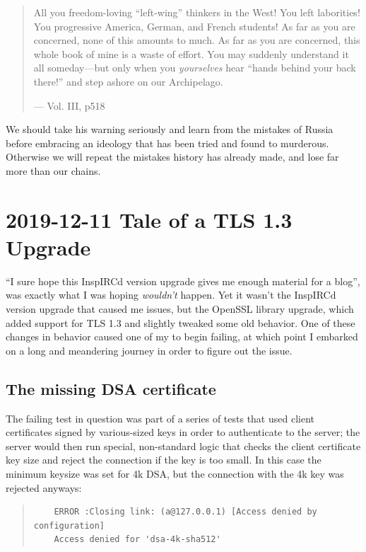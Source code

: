 \documentclass{article}
\begin{document}
\begin{quote}
All you freedom-loving ``left-wing'' thinkers in the West!  You left laborities!  You progressive America, German, and French students!  As far as you are concerned, none of this amounts to much.  As far as you are concerned, this whole book of mine is a waste of effort.  You may suddenly understand it all someday---but only when you \emph{yourselves} hear ``hands behind your back there!'' and step ashore on our Archipelago.

--- Vol. III, p518
\end{quote}

We should take his warning seriously and learn from the mistakes of Russia before embracing an ideology that has been tried and found to murderous.  Otherwise we will repeat the mistakes history has already made, and lose far more than our chains.


\section{2019-12-11 Tale of a TLS 1.3 Upgrade}
``I sure hope this InspIRCd version upgrade gives me enough material for a blog'', was exactly what I was hoping \emph{wouldn't} happen.  Yet it wasn't the InspIRCd version upgrade that caused me issues, but the OpenSSL library upgrade, which added support for TLS 1.3 and slightly tweaked some old behavior.  One of these changes in behavior caused one of my  to begin failing, at which point I embarked on a long and meandering journey in order to figure out the issue.

\subsection{The missing DSA certificate}

The failing test in question was part of a series of tests that used client certificates signed by various-sized  keys in order to authenticate to the server; the server would then run special, non-standard logic that checks the client certificate key size and reject the connection if the key is too small.  In this case the minimum keysize was set for 4k DSA, but the connection with the 4k key was rejected anyways:

\begin{quote}
\begin{verbatim}
	ERROR :Closing link: (a@127.0.0.1) [Access denied by configuration]
	Access denied for 'dsa-4k-sha512'
\end{verbatim}
\end{quote}
\end{document}
